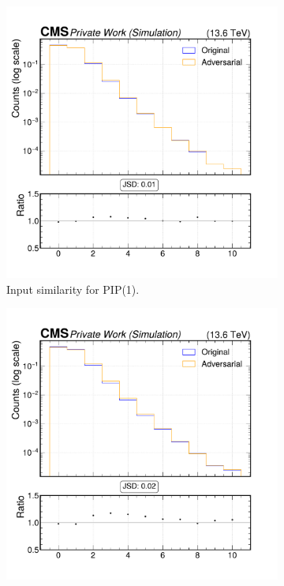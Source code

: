 \begin{figure}[h]
  \centering
  \begin{subfigure}[t]{0.32\textwidth}
    \includegraphics[width=\linewidth]{media/output/features/compare/intprob_1/cmp_global_features_nsv.pdf}
    \caption{Input similarity for PIP(1).}
  \end{subfigure}\hfill
  \begin{subfigure}[t]{0.32\textwidth}
    \includegraphics[width=\linewidth]{media/output/features/compare/intprob_2/cmp_global_features_nsv.pdf}

\end{subfigure}
\end{figure}
